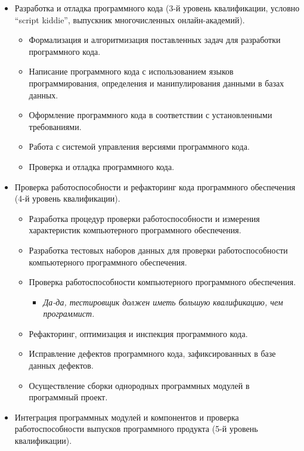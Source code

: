 \documentclass{../../text-style}
\begin{document}
\begin{itemize}
    \item Разработка и отладка программного кода (3-й уровень квалификации, условно \enquote{script kiddie}, выпускник многочисленных онлайн-академий).
    \begin{itemize}
        \item Формализация и алгоритмизация поставленных задач для разработки программного кода.
        \item Написание программного кода с использованием языков программирования, определения и манипулирования данными в базах данных.
        \item Оформление программного кода в соответствии с установленными требованиями.
        \item Работа с системой управления версиями программного кода.
        \item Проверка и отладка программного кода.
    \end{itemize}
    \item Проверка работоспособности и рефакторинг кода программного обеспечения (4-й уровень квалификации).
    \begin{itemize}
        \item Разработка процедур проверки работоспособности и измерения характеристик компьютерного программного обеспечения.
        \item Разработка тестовых наборов данных для проверки работоспособности компьютерного программного обеспечения.
        \item Проверка работоспособности компьютерного программного обеспечения.
        \begin{itemize}
            \item \emph{Да-да, тестировщик должен иметь большую квалификацию, чем программист.}
        \end{itemize}
        \item Рефакторинг, оптимизация и инспекция программного кода.
        \item Исправление дефектов программного кода, зафиксированных в базе данных дефектов.
        \item Осуществление сборки однородных программных модулей в программный проект.
    \end{itemize}
    \item Интеграция программных модулей и компонентов и проверка работоспособности выпусков программного продукта (5-й уровень квалификации).
    \begin{itemize}

\end{itemize}
\end{itemize}
\end{document}
